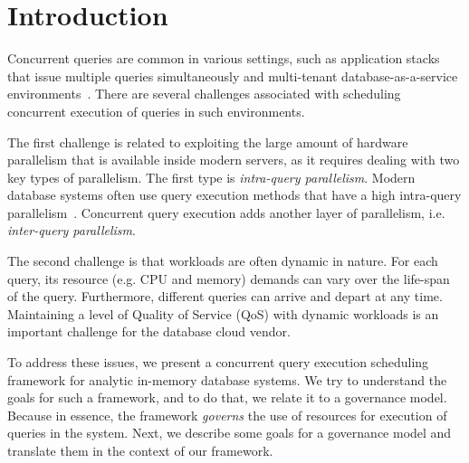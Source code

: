 \section{Introduction}\label{sec:intro}
Concurrent queries are common in various settings, such as application stacks that issue multiple queries simultaneously and multi-tenant database-as-a-service environments~\cite{NarasayyaMSLSC15, NarasayyaDSCC13}.
There are several challenges associated with scheduling  concurrent execution of queries in such environments.

The first challenge is related to exploiting the large amount of hardware parallelism that is available inside modern servers, as it requires dealing with two key types of parallelism.
The first type is \textit{intra-query parallelism}. 
Modern database systems often use query execution methods that have a high intra-query parallelism~\cite{qsstorage,morsel,wang2016elastic}.
Concurrent query execution adds another layer of parallelism, i.e. \textit{inter-query parallelism}. 

The second challenge is that workloads are often dynamic in nature. 
For each query, its resource (e.g. CPU and memory) demands can vary over the life-span of the query. 
Furthermore, different queries can arrive and depart at any time. %
Maintaining a  level of Quality of Service (QoS) with dynamic workloads is an important challenge for the database cloud vendor. 


To address these issues, we present a concurrent query execution scheduling framework for analytic in-memory database systems. 
We try to understand the goals for such a framework, and to do that, we relate it to a governance model.
Because in essence, the framework \textit{governs} the use of resources for execution of queries in the system. 
Next, we describe some goals for a governance model and translate them in the context of our framework.  

